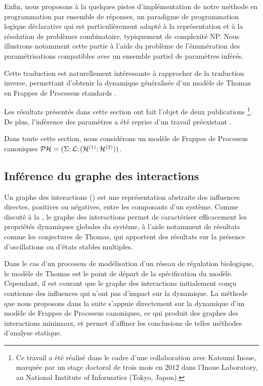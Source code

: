 Enfin, nous proposons à la  quelques pistes d'implémentation
de notre méthode en programmation par ensemble de réponses,
un paradigme de programmation logique déclarative qui est particulièrement
adapté à la représentation et à la résolution de problèmes combinatoire,
typiquement de complexité NP.
Nous illustrons notamment cette partie à l'aide du problème de l'énumération des paramétrisations
compatibles avec un ensemble partiel de paramètres inférés.

Cette traduction est naturellement intéressante à rapprocher de la traduction inverse,
permettant d'obtenir la dynamique généralisée d'un modèle de Thomas
en Frappes de Processus standards \cite[p.~176]{PMR10-TCSB}.

\myskip

Les résultats présentés dans cette section
ont fait l'objet de deux publications \cite*{FPIMR12-CMSB,FPIMR12-LDSSB}%
\footnote{Ce travail a été réalisé dans le cadre d'une collaboration avec Katsumi Inoue,
marquée par un stage doctoral de trois mois en 2012 dans l'Inoue Laboratory,
au National Institute of Informatics (Tokyo, Japon).}.
De plus, l'inférence des paramètres a été reprise d'un travail préexistant
\cite{PMR10-TCSB}.

\myskip

Dans toute cette section, nous considérons un modèle de Frappes de Processus canoniques
$\mathcal{PH} = (\Sigma; \mathcal{L}; (\mathcal{H}^{(1)}; \mathcal{H}^{(2)}))$.

\subsection{Inférence du graphe des interactions}

Un graphe des interactions () est une représentation abstraite des
influences directes, positives ou négatives, entre les composants d'un système.
Comme discuté à la , le graphe des interactions permet
de caractériser efficacement les propriétés dynamiques globales du système,
à l'aide notamment de résultats comme les conjectures de Thomas,
qui apportent des résultats sur la présence d'oscillations ou d'états stables multiples.

Dans le cas d'un processus de modélisation d'un réseau de régulation biologique, le modèle
de Thomas est le point de départ de la spécification du modèle.
Cependant, il est courant que le graphe des interactions initialement conçu contienne des
influences qui n'ont pas d'impact sur la dynamique.
La méthode que nous proposons dans la suite s'appuie directement sur la dynamique d'un modèle
de Frappes de Processus canoniques, ce qui produit des graphes des interactions minimaux,
et permet d'affiner les conclusions de telles méthodes d'analyse statique.


